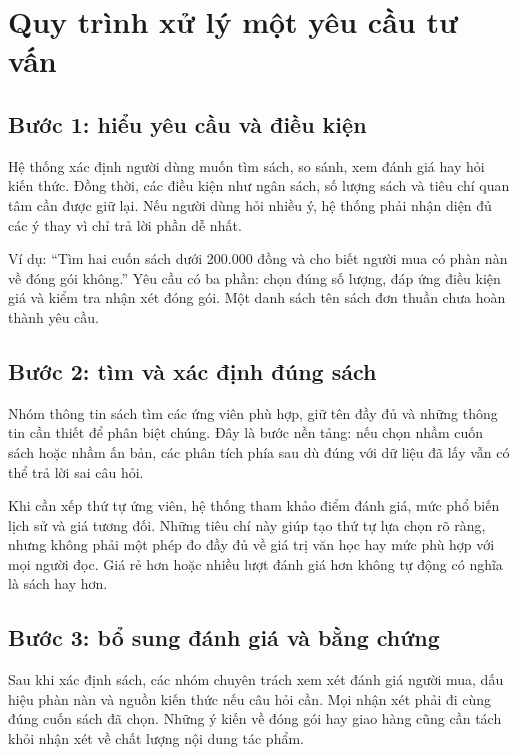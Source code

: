 \section{Quy trình xử lý một yêu cầu tư vấn}

\subsection{Bước 1: hiểu yêu cầu và điều kiện}
Hệ thống xác định người dùng muốn tìm sách, so sánh, xem đánh giá hay hỏi kiến thức. Đồng thời, các điều kiện như ngân sách, số lượng sách và tiêu chí quan tâm cần được giữ lại. Nếu người dùng hỏi nhiều ý, hệ thống phải nhận diện đủ các ý thay vì chỉ trả lời phần dễ nhất.

Ví dụ: ``Tìm hai cuốn sách dưới 200.000 đồng và cho biết người mua có phàn nàn về đóng gói không.'' Yêu cầu có ba phần: chọn đúng số lượng, đáp ứng điều kiện giá và kiểm tra nhận xét đóng gói. Một danh sách tên sách đơn thuần chưa hoàn thành yêu cầu.

\subsection{Bước 2: tìm và xác định đúng sách}
Nhóm thông tin sách tìm các ứng viên phù hợp, giữ tên đầy đủ và những thông tin cần thiết để phân biệt chúng. Đây là bước nền tảng: nếu chọn nhầm cuốn sách hoặc nhầm ấn bản, các phân tích phía sau dù đúng với dữ liệu đã lấy vẫn có thể trả lời sai câu hỏi.

Khi cần xếp thứ tự ứng viên, hệ thống tham khảo điểm đánh giá, mức phổ biến lịch sử và giá tương đối. Những tiêu chí này giúp tạo thứ tự lựa chọn rõ ràng, nhưng không phải một phép đo đầy đủ về giá trị văn học hay mức phù hợp với mọi người đọc. Giá rẻ hơn hoặc nhiều lượt đánh giá hơn không tự động có nghĩa là sách hay hơn.

\subsection{Bước 3: bổ sung đánh giá và bằng chứng}
Sau khi xác định sách, các nhóm chuyên trách xem xét đánh giá người mua, dấu hiệu phàn nàn và nguồn kiến thức nếu câu hỏi cần. Mọi nhận xét phải đi cùng đúng cuốn sách đã chọn. Những ý kiến về đóng gói hay giao hàng cũng cần tách khỏi nhận xét về chất lượng nội dung tác phẩm.


